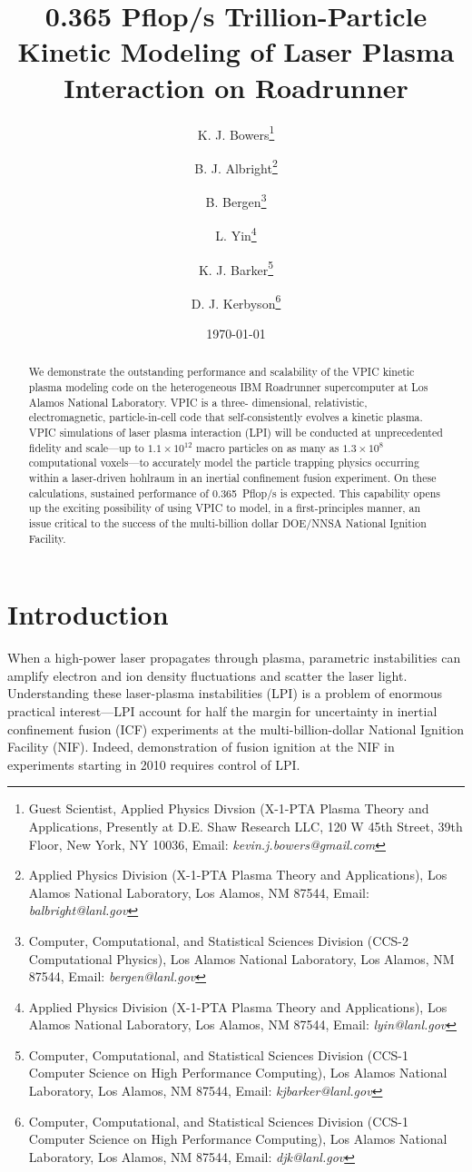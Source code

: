 \documentclass[letter,10pt]{article}
\title{0.365 Pflop/s Trillion-Particle Kinetic Modeling of Laser Plasma Interaction on Roadrunner}
\author{%
K. J. Bowers\thanks{Guest Scientist, Applied Physics Divsion (X-1-PTA Plasma Theory and Applications, Presently at D.E. Shaw Research LLC, 120 W 45th Street, 39th Floor, New York, NY 10036, Email: \emph{kevin.j.bowers@gmail.com}} \and%
%
B. J. Albright\thanks{Applied Physics Division (X-1-PTA Plasma Theory and Applications), Los Alamos National Laboratory, Los Alamos, NM 87544, Email: \emph{balbright@lanl.gov}} \and%
%
B. Bergen\thanks{Computer, Computational, and Statistical Sciences Division (CCS-2 Computational Physics), Los Alamos National Laboratory, Los Alamos, NM 87544, Email: \emph{bergen@lanl.gov}} \and%
%
L. Yin\thanks{Applied Physics Division (X-1-PTA Plasma Theory and Applications), Los Alamos National Laboratory, Los Alamos, NM 87544, Email: \emph{lyin@lanl.gov}} \and%
%
K. J. Barker\thanks{Computer, Computational, and Statistical Sciences Division (CCS-1 Computer Science on High Performance Computing), Los Alamos National Laboratory, Los Alamos, NM 87544, Email: \emph{kjbarker@lanl.gov}} \and%
%
D. J. Kerbyson\thanks{Computer, Computational, and Statistical Sciences Division (CCS-1 Computer Science on High Performance Computing), Los Alamos National Laboratory, Los Alamos, NM 87544, Email: \emph{djk@lanl.gov}}
}
\date{\today}
\begin{document}
\maketitle
\thispagestyle{empty}

\begin{singlespace}
\begin{abstract}
We demonstrate the outstanding performance and scalability of the VPIC 
kinetic plasma modeling code on the heterogeneous IBM Roadrunner 
supercomputer at Los Alamos National Laboratory.  VPIC is a three-
dimensional, relativistic, electromagnetic, particle-in-cell code that 
self-consistently evolves a kinetic plasma.  VPIC simulations of laser 
plasma interaction (LPI) will be conducted at unprecedented fidelity 
and scale---up to $1.1 \times 10^{12}$ macro particles on as many as 
$1.3 \times 10^8$ 
computational voxels---to accurately model the particle trapping physics 
occurring within a laser-driven hohlraum in an inertial confinement 
fusion experiment.  On these calculations, sustained performance of 
0.365~Pflop/s is expected. 
This capability opens up the exciting possibility of using 
VPIC to model, in a first-principles manner, an issue critical
to the success of the multi-billion dollar DOE/NNSA National Ignition Facility.  

\vspace{2in}

\end{abstract}
\end{singlespace}

\pagebreak

\section{Introduction}

When a high-power laser propagates through plasma, parametric
instabilities can amplify electron and ion density fluctuations and
scatter the laser light.  Understanding these laser-plasma
instabilities (LPI) is a problem of enormous practical interest---LPI
account for half the margin for uncertainty in inertial confinement
fusion (ICF) experiments at the multi-billion-dollar National Ignition
Facility (NIF).  Indeed, demonstration of fusion ignition at the NIF
in experiments starting in 2010 requires control of LPI.
\end{document}
